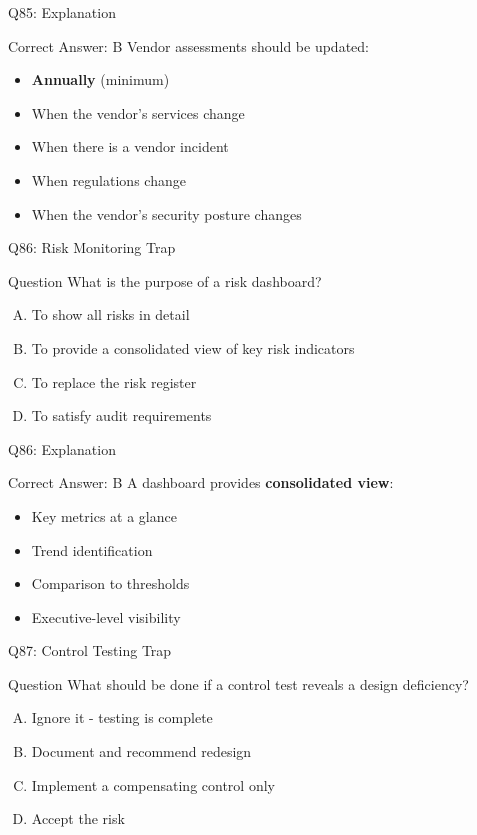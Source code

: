 \documentclass{beamer}
\begin{document}
	\begin{frame}{Q85: Explanation}
		\begin{block}{Correct Answer: B}
			Vendor assessments should be updated:
			\begin{itemize}
				\item \textbf{Annually} (minimum)
				\item When the vendor's services change
				\item When there is a vendor incident
				\item When regulations change
				\item When the vendor's security posture changes
			\end{itemize}
		\end{block}
	\end{frame}
	
	\begin{frame}{Q86: Risk Monitoring Trap}
		\begin{block}{Question}
			What is the purpose of a risk dashboard?
		\end{block}
		\begin{enumerate}[(A)]
			\item To show all risks in detail
			\item To provide a consolidated view of key risk indicators
			\item To replace the risk register
			\item To satisfy audit requirements
		\end{enumerate}
	\end{frame}
	
	\begin{frame}{Q86: Explanation}
		\begin{block}{Correct Answer: B}
			A dashboard provides \textbf{consolidated view}:
			\begin{itemize}
				\item Key metrics at a glance
				\item Trend identification
				\item Comparison to thresholds
				\item Executive-level visibility
			\end{itemize}
		\end{block}
	\end{frame}
	
	\begin{frame}{Q87: Control Testing Trap}
		\begin{block}{Question}
			What should be done if a control test reveals a design deficiency?
		\end{block}
		\begin{enumerate}[(A)]
			\item Ignore it - testing is complete
			\item Document and recommend redesign
			\item Implement a compensating control only
			\item Accept the risk
		\end{enumerate}
	\end{frame}
	
\end{document}
